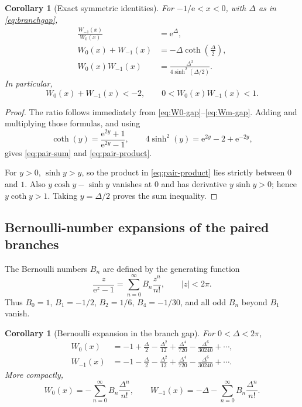 \documentclass[11pt]{article}
\newtheorem{corollary}[theorem]{Corollary}
\theoremstyle{remark}
\newcommand{\Wz}{W_0}
\newcommand{\Wm}{W_{-1}}
\newcommand{\ee}{\mathrm e}
\begin{document}
\begin{corollary}[Exact symmetric identities]\label{cor:pair-symmetric}
For \(-1/\ee<x<0\), with \(\Delta\) as in
\eqref{eq:branchgap},
\begin{align}
 \frac{\Wm(x)}{\Wz(x)}&=\ee^\Delta,
 \label{eq:pair-ratio}\\
 \Wz(x)+\Wm(x)&=-\Delta\coth\left(\frac\Delta2\right),
 \label{eq:pair-sum}\\
 \Wz(x)\Wm(x)&=
 \frac{\Delta^2}{4\sinh^2(\Delta/2)}.
 \label{eq:pair-product}
\end{align}
In particular,
\begin{equation}\label{eq:pair-inequalities}
       \Wz(x)+\Wm(x)<-2,
       \qquad 0<\Wz(x)\Wm(x)<1.
\end{equation}
\end{corollary}

\begin{proof}
The ratio follows immediately from
\eqref{eq:W0-gap}--\eqref{eq:Wm-gap}.  Adding and multiplying those
formulas, and using
\[
 \coth(y)=\frac{\ee^{2y}+1}{\ee^{2y}-1},
 \qquad
 4\sinh^2(y)=\ee^{2y}-2+\ee^{-2y},
\]
gives \eqref{eq:pair-sum} and \eqref{eq:pair-product}.

For \(y>0\), \(\sinh y>y\), so the product in
\eqref{eq:pair-product} lies strictly between \(0\) and \(1\).  Also
\(y\cosh y-\sinh y\) vanishes at \(0\) and has derivative
\(y\sinh y>0\); hence \(y\coth y>1\).  Taking \(y=\Delta/2\)
proves the sum inequality.
\end{proof}

\subsection{Bernoulli-number expansions of the paired branches}

The Bernoulli numbers \(B_n\) are defined by the generating function
\begin{equation}\label{eq:bernoulli-gen}
       \frac{z}{\ee^z-1}
       =\sum_{n=0}^{\infty}B_n\frac{z^n}{n!},
       \qquad |z|<2\pi.
\end{equation}
Thus \(B_0=1\), \(B_1=-1/2\), \(B_2=1/6\),
\(B_4=-1/30\), and all odd \(B_n\) beyond \(B_1\) vanish.

\begin{corollary}[Bernoulli expansion in the branch gap]
For \(0<\Delta<2\pi\),
\begin{align}
 \Wz(x)
 &=-1+\frac\Delta2-\frac{\Delta^2}{12}
   +\frac{\Delta^4}{720}-\frac{\Delta^6}{30240}+\cdots,
 \label{eq:W0-Bernoulli}\\
 \Wm(x)
 &=-1-\frac\Delta2-\frac{\Delta^2}{12}
   +\frac{\Delta^4}{720}-\frac{\Delta^6}{30240}+\cdots.
 \label{eq:Wm-Bernoulli}
\end{align}
More compactly,
\begin{equation}\label{eq:pair-Bernoulli-general}
 \Wz(x)=-\sum_{n=0}^{\infty}B_n\frac{\Delta^n}{n!},
 \qquad
 \Wm(x)=-\Delta-
          \sum_{n=0}^{\infty}B_n\frac{\Delta^n}{n!}.
\end{equation}
\end{corollary}
\end{document}
